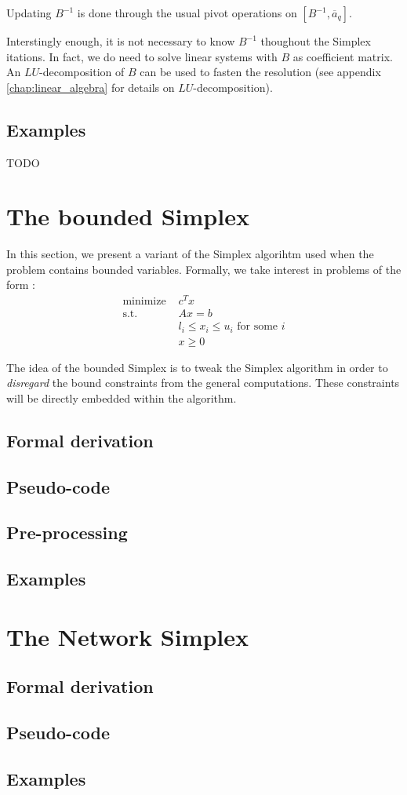 Updating $B^{-1}$ is done through the usual pivot operations on $[B^{-1}, \overline a_q]$. 

Interstingly enough, it is not necessary to know $B^{-1}$ thoughout the Simplex itations. In fact, we do need to solve linear systems with $B$ as coefficient matrix. An $LU$-decomposition of $B$ can be used to fasten the resolution (see appendix \ref{chap:linear_algebra} for details on $LU$-decomposition).

\subsection{Examples}

TODO

\section{The bounded Simplex}

In this section, we present a variant of the Simplex algorihtm used when the problem contains bounded variables. Formally, we take interest in problems of the form : 
\begin{align*}
    \textrm{minimize } & c^Tx \\
    \textrm{s.t. } & Ax = b\\
    & l_i \le x_i \le u_i \textrm{ for some }i\\
    & x \ge 0
\end{align*}

The idea of the bounded Simplex is to tweak the Simplex algorithm in order to \textit{disregard} the bound constraints from the general computations. These constraints will be directly embedded within the algorithm. 

\subsection{Formal derivation}
\subsection{Pseudo-code}
\subsection{Pre-processing}
\subsection{Examples}

\section{The Network Simplex}
\subsection{Formal derivation}
\subsection{Pseudo-code}
\subsection{Examples}